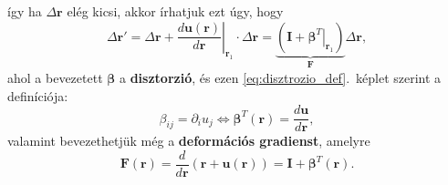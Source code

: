 \documentclass[12pt,a4paper]{scrartcl}
\let\mathbf\bm
\begin{document}
így ha ${\Delta {\mathbf{r}}}$ elég kicsi, akkor írhatjuk ezt úgy, hogy 
\begin{equation} \label{eq:disztrozio_def}
\Delta {\mathbf{r}}' = \Delta {\mathbf{r}} + {\left. {\frac{{d{\mathbf{u}}\left( {\mathbf{r}} \right)}}{{d{\mathbf{r}}}}} \right|_{{{\mathbf{r}}_1}}} \cdot \Delta {\mathbf{r}} = \underbrace {\left( {{\mathbf{I}} + {{\left. {{{\mathbf{\beta }}^T}} \right|}_{{{\mathbf{r}}_1}}}} \right)}_{\mathbf{F}}\Delta {\mathbf{r}},
\end{equation}
ahol a bevezetett ${\mathbf{\beta }}$ a \textbf{disztorzió}, és ezen \eqref{eq:disztrozio_def}.\ képlet szerint a definíciója:
\begin{equation} \label{eq:disztrozio_szamolas}
{\beta _{ij}} = {\partial _i}{u_j} \Leftrightarrow {{\mathbf{\beta }}^T}\left( {\mathbf{r}} \right) = \frac{{d{\mathbf{u}}}}{{d{\mathbf{r}}}},
\end{equation}
valamint bevezethetjük még a \textbf{deformációs gradienst}, amelyre
\[{\mathbf{F}}\left( {\mathbf{r}} \right) = \frac{d}{{d{\mathbf{r}}}}\left( {{\mathbf{r}} + {\mathbf{u}}\left( {\mathbf{r}} \right)} \right) = {\mathbf{I}} + {{\mathbf{\beta }}^T}\left( {\mathbf{r}} \right).\]
\end{document}
